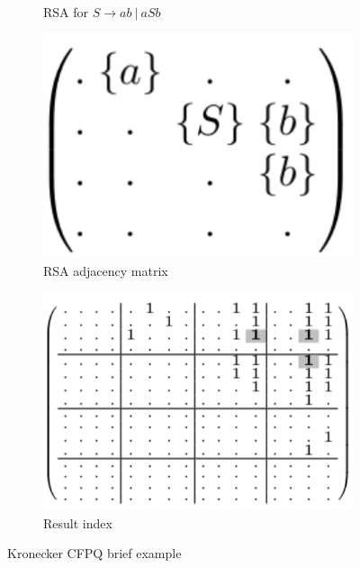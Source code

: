 \documentclass[xcolor=table,english]{beamer}
\begin{document}
\begin{frame}[fragile]
\begin{figure}
\begin{subfigure}[b]{0.2\textwidth}
            \caption{RSA for $S \rightarrow ab~|~aSb$}
        \end{subfigure}
        \hfill
        \begin{subfigure}[b]{0.2\textwidth}
            \includegraphics[width=\textwidth]{figures/automata_matrix.png}
            \caption{RSA adjacency matrix}
        \end{subfigure}
        \hfill
        \begin{subfigure}[b]{0.3\textwidth}
            \includegraphics[width=\textwidth]{figures/kronecker_result.png}
            \caption{Result index}
        \end{subfigure}
        \caption{Kronecker CFPQ brief example}
    \end{figure}
\end{frame}
\end{document}
